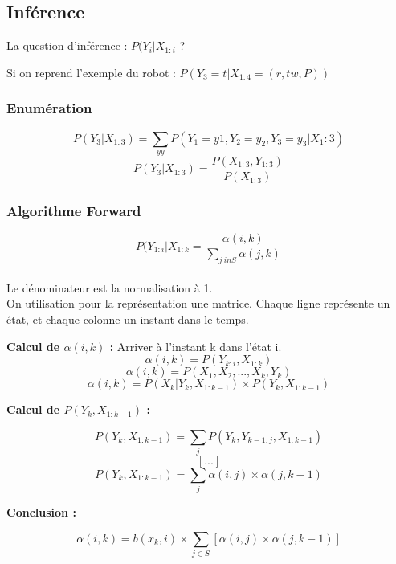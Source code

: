 \documentclass{article}
\begin{document}
\subsection{Inférence}

La question d'inférence : $ P(Y_i | X_{1:i}$ ?

Si on reprend l'exemple du robot : $P(Y_3 = t | X_{1:4} = (r, tw, P))$

\subsubsection{Enumération}

$$ P(Y_3 | X_{1:3}) = \sum_{y y} P(Y_1 = y1, Y_2 = y_2, Y_3 = y_3 | X_1:3) $$
$$ P(Y_3 | X_{1:3}) = \frac{P(X_{1:3}, Y_{1:3})}{P(X_{1:3})} $$

\subsubsection{Algorithme Forward}

$$ P(Y_{1:i} | X_{1:k} = \frac{\alpha(i, k)}{\sum_{j \ in S} \alpha(j, k)} $$
\\
Le dénominateur est la normalisation à 1.
\\
On utilisation pour la représentation une matrice. Chaque ligne représente un état, et chaque colonne un instant dans le temps.

\textbf{Calcul de $\alpha(i, k)$ :} Arriver à l'instant k dans l'état i.
$$ \alpha(i, k) = P(Y_{k:i}, X_{1:k}) $$
$$ \alpha(i, k) = P(X_1, X_2, ..., X_k, Y_k) $$
$$ \alpha(i, k) = P(X_k | Y_k, X_{1:k-1}) \times P(Y_k, X_{1:k-1})$$

\textbf{Calcul de $P(Y_k, X_{1:k-1})$ :}

$$ P(Y_k, X_{1:k-1}) = \sum_j P(Y_k, Y_{k-1:j}, X_{1:k-1}) $$
$$ [...] $$
$$ P(Y_k, X_{1:k-1}) = \sum_j \alpha(i ,j) \times \alpha(j, k-1) $$

\textbf{Conclusion :}

$$ \alpha(i, k) = b(x_k, i) \times \sum_{j \in S} [\alpha(i, j) \times \alpha(j, k-1)] $$

\end{document}
